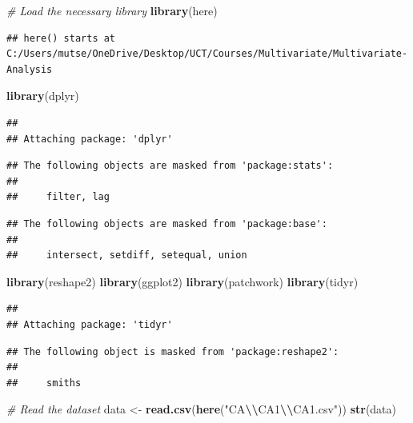 \documentclass[
]{article}
\author{}
\date{\vspace{-2.5em}}
\newenvironment{Shaded}{\begin{snugshade}}{\end{snugshade}}
\newcommand{\CommentTok}[1]{\textcolor[rgb]{0.56,0.35,0.01}{\textit{#1}}}
\newcommand{\FunctionTok}[1]{\textcolor[rgb]{0.13,0.29,0.53}{\textbf{#1}}}
\newcommand{\NormalTok}[1]{#1}
\newcommand{\OtherTok}[1]{\textcolor[rgb]{0.56,0.35,0.01}{#1}}
\newcommand{\SpecialCharTok}[1]{\textcolor[rgb]{0.81,0.36,0.00}{\textbf{#1}}}
\newcommand{\StringTok}[1]{\textcolor[rgb]{0.31,0.60,0.02}{#1}}
\begin{document}
\begin{Shaded}
\begin{Highlighting}[]
\CommentTok{\# Load the necessary library}
\FunctionTok{library}\NormalTok{(here)}
\end{Highlighting}
\end{Shaded}

\begin{verbatim}
## here() starts at C:/Users/mutse/OneDrive/Desktop/UCT/Courses/Multivariate/Multivariate-Analysis
\end{verbatim}

\begin{Shaded}
\begin{Highlighting}[]
\FunctionTok{library}\NormalTok{(dplyr)}
\end{Highlighting}
\end{Shaded}

\begin{verbatim}
## 
## Attaching package: 'dplyr'
\end{verbatim}

\begin{verbatim}
## The following objects are masked from 'package:stats':
## 
##     filter, lag
\end{verbatim}

\begin{verbatim}
## The following objects are masked from 'package:base':
## 
##     intersect, setdiff, setequal, union
\end{verbatim}

\begin{Shaded}
\begin{Highlighting}[]
\FunctionTok{library}\NormalTok{(reshape2)}
\FunctionTok{library}\NormalTok{(ggplot2)}
\FunctionTok{library}\NormalTok{(patchwork)}
\FunctionTok{library}\NormalTok{(tidyr)}
\end{Highlighting}
\end{Shaded}

\begin{verbatim}
## 
## Attaching package: 'tidyr'
\end{verbatim}

\begin{verbatim}
## The following object is masked from 'package:reshape2':
## 
##     smiths
\end{verbatim}

\begin{Shaded}
\begin{Highlighting}[]
\CommentTok{\# Read the dataset}
\NormalTok{data }\OtherTok{\textless{}{-}} \FunctionTok{read.csv}\NormalTok{(}\FunctionTok{here}\NormalTok{(}\StringTok{"CA}\SpecialCharTok{\textbackslash{}\textbackslash{}}\StringTok{CA1}\SpecialCharTok{\textbackslash{}\textbackslash{}}\StringTok{CA1.csv"}\NormalTok{))}
\FunctionTok{str}\NormalTok{(data)}
\end{Highlighting}
\end{Shaded}
\end{document}
